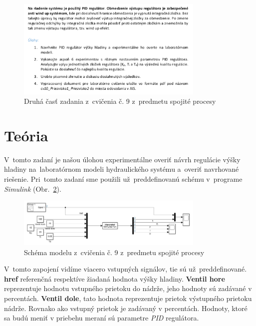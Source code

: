 \documentclass{article}
\begin{document}
\begin{figure}[!htbp]
	\begin{center}
		\includegraphics[width=0.8\textwidth]{./include/zadaniep2.png}
	\end{center}
	\caption{Druhá časť zadania z~cvičenia č. 9 z~predmetu spojité procesy}
		\label{fig:zadanie2}
\end{figure}

\clearpage

\section{Teória}
\label{sec:teoria}

V~tomto zadaní je našou úlohou experimentálne overiť návrh regulácie výšky hladiny na~laboratórnom
modeli hydraulického systému a~overiť navrhované riešenie. Pri~tomto zadaní sme použili už~preddefinovanú schému
v~programe \textit{Simulink} (Obr.~\ref{fig:schema}).

\begin{figure}[!htbp]
	\begin{center}
		\includegraphics[width=0.8\textwidth]{./include/schema.png}
	\end{center}
	\caption{Schéma modelu z~cvičenia č. 9 z~predmetu spojité procesy}
	\label{fig:schema}
\end{figure}

V~tomto zapojení vidíme viacero vstupných signálov, tie sú už~preddefinované. \textbf{href} referenčná respektíve
žiadaná hodnota výšky hladiny. \textbf{Ventil hore} reprezentuje hodnotu vstupného prietoku do nádrže, jeho hodnoty
sú zadávané v percentách. \textbf{Ventil dole}, tato hodnota reprezentuje prietok výstupného prietoku nádrže.
Rovnako ako vstupný prietok je zadávaný v percentách. Hodnoty, ktoré sa budú meniť v priebehu meraní sú parametre
\textit{PID} regulátora.
\end{document}
